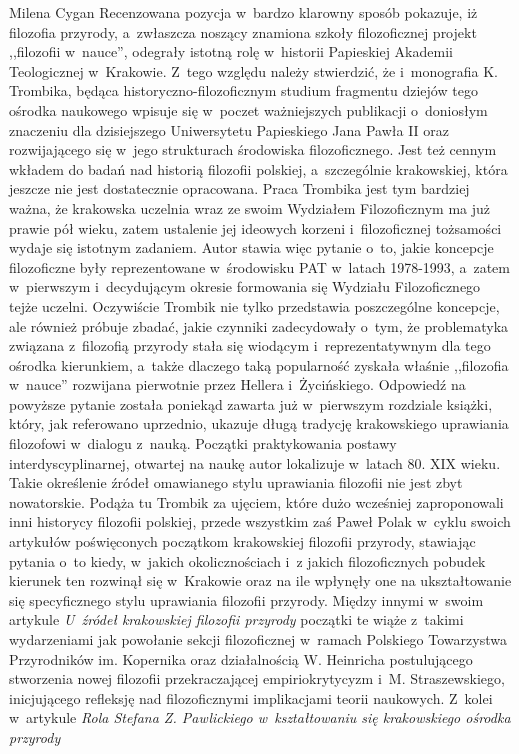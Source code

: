 \begin{newrevplenv}{Milena Cygan}
Recenzowana pozycja w~bardzo klarowny sposób pokazuje, iż filozofia przyrody, a~zwłaszcza noszący znamiona szkoły filozoficznej projekt ,,filozofii w~nauce'', odegrały istotną rolę w~historii Papieskiej Akademii Teologicznej w~Krakowie. Z~tego względu należy stwierdzić, że i~monografia K. Trombika, będąca historyczno-filozoficznym studium fragmentu dziejów tego ośrodka naukowego wpisuje się w~poczet ważniejszych publikacji o~doniosłym znaczeniu dla dzisiejszego Uniwersytetu Papieskiego Jana Pawła II oraz rozwijającego się w~jego strukturach środowiska filozoficznego. Jest też cennym wkładem do badań nad historią filozofii polskiej, a~szczególnie krakowskiej, która jeszcze nie jest dostatecznie opracowana. Praca Trombika jest tym bardziej ważna, że krakowska uczelnia wraz ze swoim Wydziałem Filozoficznym ma już prawie pół wieku, zatem ustalenie jej ideowych korzeni i~filozoficznej tożsamości wydaje się istotnym zadaniem. Autor stawia więc pytanie o~to, jakie koncepcje filozoficzne były reprezentowane w~środowisku PAT w~latach 1978-1993, a~zatem w~pierwszym i~decydującym okresie formowania się Wydziału Filozoficznego tejże uczelni. Oczywiście Trombik nie tylko przedstawia poszczególne koncepcje, ale również próbuje zbadać, jakie czynniki zadecydowały o~tym, że problematyka związana z~filozofią przyrody stała się wiodącym i~reprezentatywnym dla tego ośrodka kierunkiem, a~także dlaczego taką popularność zyskała właśnie ,,filozofia w~nauce'' rozwijana pierwotnie przez Hellera i~Życińskiego. Odpowiedź na powyższe pytanie została poniekąd zawarta już w~pierwszym rozdziale książki, który, jak referowano uprzednio, ukazuje długą tradycję krakowskiego uprawiania filozofowi w~dialogu z~nauką. Początki praktykowania postawy interdyscyplinarnej, otwartej na naukę autor lokalizuje w~latach 80. XIX wieku. Takie określenie źródeł omawianego stylu uprawiania filozofii nie jest zbyt nowatorskie. Podąża tu Trombik za ujęciem, które dużo wcześniej zaproponowali inni historycy filozofii polskiej, przede wszystkim zaś Paweł Polak w~cyklu swoich artykułów poświęconych początkom krakowskiej filozofii przyrody, stawiając pytania o~to kiedy, w~jakich okolicznościach i~z jakich filozoficznych pobudek kierunek ten rozwinął się w~Krakowie oraz na ile wpłynęły one na ukształtowanie się specyficznego stylu uprawiania filozofii przyrody. Między innymi w~swoim artykule \textit{U~źródeł krakowskiej filozofii przyrody}
\parencite[][s.~135]{polak_u_2011} %
 początki te wiąże z~takimi wydarzeniami jak powołanie sekcji filozoficznej w~ramach Polskiego Towarzystwa Przyrodników im. Kopernika oraz działalnością W. Heinricha postulującego stworzenia nowej filozofii przekraczającej empiriokrytycyzm i~M. Straszewskiego, inicjującego refleksję nad filozoficznymi implikacjami teorii naukowych. Z~kolei w~artykule \textit{Rola Stefana Z. Pawlickiego w~kształtowaniu się krakowskiego ośrodka przyrody}

\end{newrevplenv}
